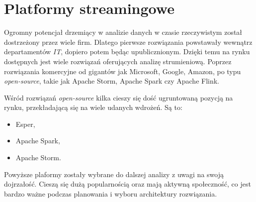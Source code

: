 \section{Platformy streamingowe}
Ogromny potencjał drzemiący w analizie danych w czasie rzeczywistym został dostrzeżony przez wiele firm.
Dlatego pierwsze rozwiązania powstawały wewnątrz departamentów \textit{IT},
dopiero potem będąc upublicznionym.
Dzięki temu na rynku dostępnych jest wiele rozwiązań oferujących analizę strumieniową.
Poprzez rozwiązania komercyjne od gigantów jak Microsoft, Google, Amazon,
po typu \textit{open-source},
takie jak Apache Storm, Apache Spark czy Apache Flink.

Wśród rozwiązań \textit{open-source} kilka cieszy się dość ugruntowaną pozycją na rynku,
przekładającą się na wiele udanych wdrożeń.
Są to:
\begin{itemize}
	\item Esper,
	\item Apache Spark,
	\item Apache Storm.
\end{itemize}

Powyższe plaformy zostały wybrane do dalszej analizy z uwagi na swoją dojrzałość.
Cieszą się dużą popularnością oraz mają aktywną społeczność,
co jest bardzo ważne podczas planowania i wyboru architektury rozwiązania.




